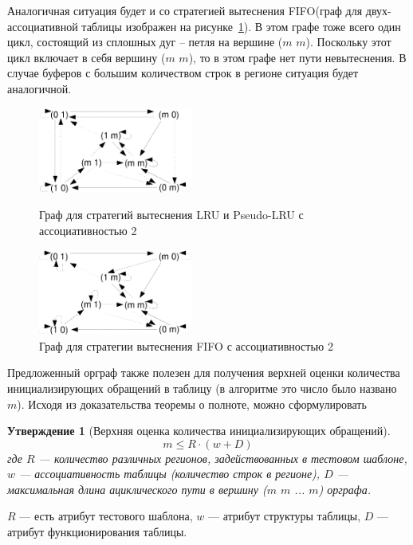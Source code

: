\documentclass[14pt]{extreport}
\newtheorem{utv}{Утверждение}
\newcommand{\LRU}{\textsf{LRU}\xspace}
\newcommand{\FIFO}{\textsf{FIFO}\xspace}
\newcommand{\PseudoLRU}{\textsf{Pseudo-LRU}\xspace}
\begin{document}
Аналогичная ситуация будет и со стратегией вытеснения \FIFO (граф
для двух-ассоциативной таблицы изображен на рисунке~\ref{fig:fifopolicy}). В этом графе тоже всего один цикл, состоящий из сплошных дуг -- петля на вершине ($m$ $m$). Поскольку
этот цикл включает в себя вершину ($m$ $m$), то в этом графе нет
пути невытеснения. В случае буферов с большим количеством строк в регионе
ситуация будет аналогичной.

\begin{figure}[t]
\parbox{0.5\textwidth}{ \centering
  \includegraphics[width=0.45\textwidth]{2.theor/lrupolicy}
  \caption{Граф для стратегий вытеснения \LRU и \PseudoLRU с ассоциативностью 2}
  \label{fig:lrupolicy}
} \vline
\parbox{0.5\textwidth}{ \centering
  \includegraphics[width=0.45\textwidth]{2.theor/fifopolicy}
  \caption{Граф для стратегии вытеснения \FIFO с ассоциативностью 2}
  \label{fig:fifopolicy}
}
\end{figure}


Предложенный орграф также полезен для получения верхней оценки количества инициализирующих обращений в таблицу (в алгоритме это число было названо $m$). Исходя из доказательства теоремы о полноте, можно сформулировать

\begin{utv}[Верхняя оценка количества инициализирующих обращений]
$$m \leqslant R \cdot (w + D)$$
где $R$ --- количество различных регионов, задействованных в тестовом шаблоне, $w$ --- ассоциативность таблицы (количество строк в регионе), $D$ --- максимальная длина ациклического пути в вершину ($m$ $m$ ... $m$) орграфа.
\end{utv}

$R$ --- есть атрибут тестового шаблона, $w$ --- атрибут структуры таблицы, $D$ --- атрибут функционирования таблицы.
\end{document}
